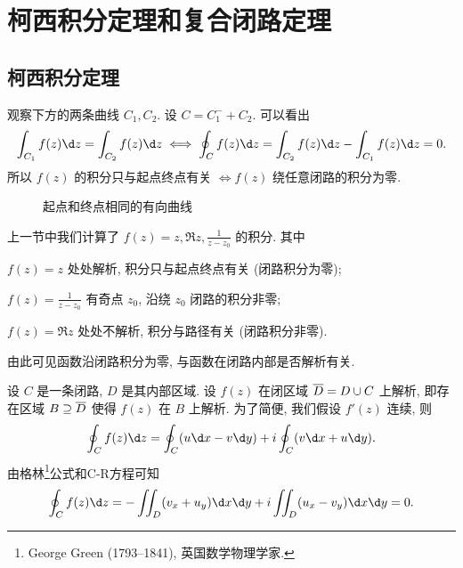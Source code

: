 \section{柯西积分定理和复合闭路定理}

\subsection{柯西积分定理}

观察下方的两条曲线 $C_1,C_2$. 设 $C=C_1^-+C_2$. 可以看出
\[
  \int_{C_1}f(z)\d z=\int_{C_2}f(z)\d z\iff
  \oint_Cf(z)\d z=\int_{C_2}f(z)\d z-\int_{C_1}f(z)\d z=0.
\]
所以 \alert{$f(z)$ 的积分只与起点终点有关 $\iff f(z)$ 绕任意闭路的积分为零}.

\begin{figure}[!ht]
  \centering
  \caption{起点和终点相同的有向曲线}
\end{figure}

上一节中我们计算了 $f(z)=z,\Re z,\frac1{z-z_0}$ 的积分.
其中
\begin{itempar}
  \item $f(z)=z$ 处处解析, 积分只与起点终点有关 (闭路积分为零);
  \item $f(z)=\frac1{z-z_0}$ 有奇点 $z_0$, 沿绕 $z_0$ 闭路的积分非零;
  \item $f(z)=\Re z$ 处处不解析, 积分与路径有关 (闭路积分非零).
\end{itempar}
由此可见函数沿闭路积分为零,
与函数在闭路内部是否解析有关.

设 $C$ 是一条闭路, $D$ 是其内部区域.
设 \alert{$f(z)$ 在闭区域 $\overline D=D\cup C$ 上解析},
即存在区域 $B\supseteq\overline D$ 使得 $f(z)$ 在 $B$ 上解析.
为了简便, 我们假设 $f'(z)$ 连续,
则
\[
  \oint_Cf(z)\d z=\oint_C(u\d x-v\d y)+i\oint_C(v\d x+u\d y).
\]
由格林\footnote{
  George Green (1793--1841), 英国数学物理学家.
}公式和C-R方程可知
\[
  \oint_Cf(z)\d z=-\iint_D(v_x+u_y)\d x\d y+i\iint_D(u_x-v_y)\d x\d y=0.
\]

